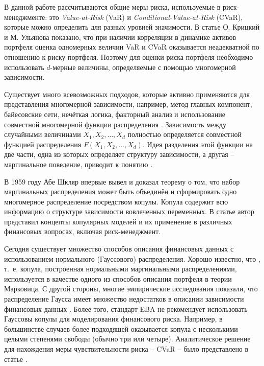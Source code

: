 \newpage


В данной работе рассчитываются общие меры риска, используемые в риск-менеджменте: это \textit{Value-at-Risk} (VaR) и \textit{Conditional-Value-at-Risk} (CVaR), которые можно определить для разных уровней значимости. 
В статье О. Крицкий и М. Ульянова \cite{Kritski2007} показано, что при наличии корреляции в динамике активов портфеля оценка одномерных величин VaR и CVaR оказывается неадекватной по отношению к риску портфеля. 
Поэтому для оценки риска портфеля необходимо использовать $d$-мерные величины, определяемые с помощью многомерной зависимости.

Существует много всевозможных подходов, которые активно применяются для представления многомерной зависимости, например, метод главных компонент, байесовские сети, нечёткая логика, факторный анализ и использование совместной многомерной функции распределения \cite{Huynh2014, Kole2007}. 
Зависимость между случайными величинами $X_1, X_2, \ldots, X_d$ полностью определяется совместной функцией распределения $F(X_1, X_2, \ldots, X_d)$. 
Идея разделения этой функции на две части, одна из которых определяет структуру зависимости, а другая -- маргинальное поведение, приводит к понятию .

В 1959 году Абе Шкляр \cite{Sklar1959} впервые вывел и доказал теорему о том, что набор маргинальных распределения может быть объединён и сформировать одно многомерное распределение посредством копулы. 
Копула содержит всю информацию о структуре зависимости вовлеченных переменных. 
В статье \cite{Penikas2010} автор представил концепты копулярных моделей и их применение в различных финансовых вопросах, включая риск-менеджмент.

Сегодня существует множество способов описания финансовых данных с использованием нормального (Гауссового) распределения. 
Хорошо известно, что , т.~е. копула, построенная нормальными маргинальными распределениями, используется в качестве одного из способов описания портфеля в теории Марковица. 
С другой стороны, многие эмпирические исследования показали, что распределение Гаусса имеет множество недостатков в описании зависимости финансовых данных \cite{Limp2011, Rachev2005, Wilmott2007}. 
Более того, стандарт EBA \cite{EBA2015} не рекомендует использовать Гауссовы копулы для моделирования финансового риска. 
Например, в большинстве случаев более подходящей оказывается копула  с несколькими целыми степенями свободы (обычно три или четыре).
Аналитическое решение для нахождения меры чувствительности риска -- CVaR -- было представлено в статье \cite{Stoyanov2013}.

